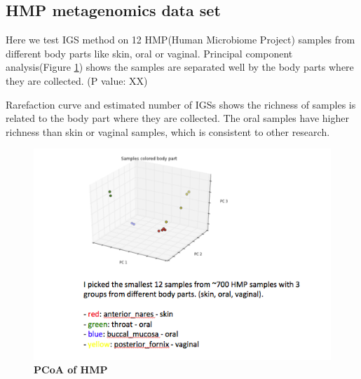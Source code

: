 \documentclass{article}
\begin{document}


\subsection{HMP metagenomics data set}
Here we test IGS method on 12 HMP(Human Microbiome Project) samples from different body parts like skin, oral or vaginal. 
Principal component analysis(Figure \ref{fig:HMP_beta}) shows the samples are separated well by the body parts where they are collected. (P value: XX)

Rarefaction curve and estimated number of IGSs shows the richness of samples is related to the body part where they are collected. The 
oral samples have higher richness than skin or vaginal samples, which is consistent  to other research. 



\begin{figure}[!ht]
 \centerline{\includegraphics[width=7in]{./figures/HMP_beta.png}}
\caption{\bf PCoA of HMP}
\label{fig:HMP_beta}
\end{figure}
\end{document}
